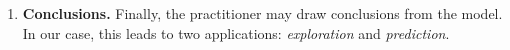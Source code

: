 \begin{enumerate}
  
  \item \textbf{Conclusions.} Finally, the practitioner may draw
    conclusions from the model.  In our case, this leads to two
    applications: \emph{exploration} and \emph{prediction}.  




\end{enumerate}

